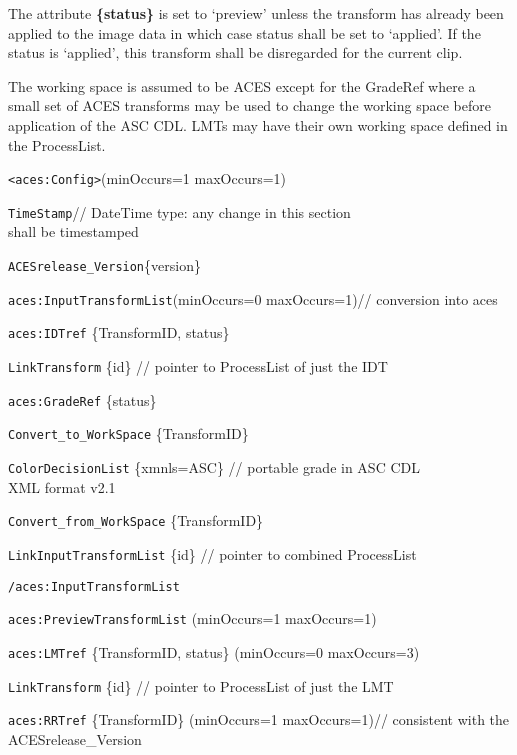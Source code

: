 The attribute \textbf{\{status\}} is set to `preview' unless the transform has already been applied to the image data in which case status shall be set to `applied'. If the status is `applied', this transform shall be disregarded for the current clip.

The working space is assumed to be ACES except for the GradeRef where a small set of ACES transforms may be used to change the working space before application of the ASC CDL. LMTs may have their own working space defined in the ProcessList.

\texttt{<aces:Config>}\tabto{1.5in}(minOccurs=1 maxOccurs=1)

	\tabto{2em}\texttt{TimeStamp}\tabto{3.5in}// DateTime type: any change in this section\\\tabto{3.6in}shall be timestamped \par
	\tabto{2em}\texttt{ACESrelease\_Version}\{version\} \par
	\tabto{2em}\texttt{aces:InputTransformList}\tabto{3in}(minOccurs=0 maxOccurs=1)\tabto{3.5in}// conversion into aces \par
	\tabto{4em}\texttt{aces:IDTref} \{TransformID, status\} \par
	\tabto{6em}\texttt{LinkTransform} \{id\} \tabto{3.5in}// pointer to ProcessList of just the IDT\par
	\tabto{4em}\texttt{aces:GradeRef} \{status\} \par
	\tabto{6em}\texttt{Convert\_to\_WorkSpace} \{TransformID\} \par
	\tabto{6em}\texttt{ColorDecisionList} \{xmnls=ASC\} \tabto{3.5in}// portable grade in ASC CDL\\\tabto{3.6in}XML format v2.1\par
	\tabto{6em}\texttt{Convert\_from\_WorkSpace} \{TransformID\} \par
	\tabto{4em}\texttt{LinkInputTransformList} \{id\} \tabto{3.5in}// pointer to combined ProcessList \par
	\tabto{2em}\texttt{/aces:InputTransformList} \par
	\tabto{2em}\texttt{aces:PreviewTransformList} \tabto{3in}(minOccurs=1 maxOccurs=1)\par
	\tabto{4em}\texttt{aces:LMTref} \{TransformID, status\} \tabto{3in}(minOccurs=0 maxOccurs=3)\par
	\tabto{6em}\texttt{LinkTransform} \{id\} \tabto{3.5in}// pointer to ProcessList of just the LMT\par
	\tabto{4em}\texttt{aces:RRTref} \{TransformID\} \tabto{3in}(minOccurs=1 maxOccurs=1)\tabto{3.5in}// consistent with the ACESrelease\_Version\par
